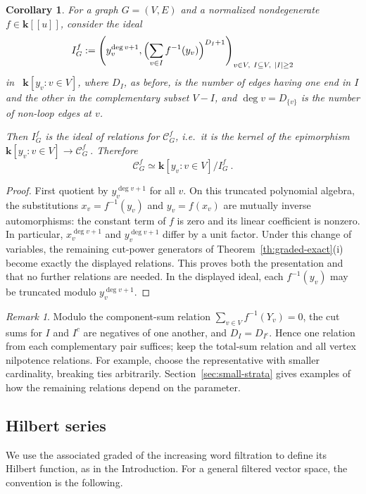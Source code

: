 \documentclass[reqno]{article}
\theoremstyle{plain} %
\newtheorem{corollary}[theorem]{Corollary}
\theoremstyle{definition}
\theoremstyle{remark}
\newtheorem{remark}[theorem]{\sc Remark}
\newcommand{\K} {\mathbf{k}}
\newcommand {\CC}{\mathscr{C}}
\numberwithin{equation}{section}
\begin{document}
\begin{corollary}\label{cor:relations}
  For a graph $G=(V,E)$ and a normalized nondegenerate $f \in \K[[u]]$,
consider the ideal
\begin{equation}
  \label{eq:relations}
I_G^f := \left(y_v^{\deg v+1}, \Bigl( \sum_{v\in I}f^{-1}(y_v) \Bigr) ^{D_I+1}\right)_{v\in V, \ I  \subseteq V, \ |I| \ge 2 }
\end{equation}
in \ $\K[y_v:v\in V]$, where $D_I$, as before, is the number of edges having one end in $I$ and the other  in the complementary subset $V-I$, and $\deg v=D_{\{v\}}$ is the number of non-loop edges at $v$.

Then $I_G^f$ is the ideal of relations for $\CC_G^f$, i.e.\ it is the kernel of the epimorphism
$\K[y_v \colon v\in V]\to \CC_G^f~.$
Therefore
\[\CC_G^f\simeq \K[y_v \colon v\in V]/I_G^f~.\]
 \end{corollary}
\begin{proof}
First quotient by $y_v^{\deg v+1}$ for all $v$. On this truncated
polynomial algebra, the substitutions $x_v=f^{-1}(y_v)$ and
$y_v=f(x_v)$ are mutually inverse automorphisms: the constant term of
$f$ is zero and its linear coefficient is nonzero. In particular,
$x_v^{\deg v+1}$ and $y_v^{\deg v+1}$ differ by a unit factor.
Under this change of variables, the remaining cut-power generators of
Theorem~\ref{th:graded-exact}(i) become exactly the displayed relations.
This proves both the presentation and that no further relations are
needed. In the displayed ideal, each $f^{-1}(y_v)$ may be truncated
modulo $y_v^{\deg v+1}$.
\end{proof}


\begin{remark}
Modulo the component-sum relation $\sum_{v\in V}f^{-1}(Y_v)=0$,
the cut sums for $I$ and $I^c$ are negatives of one another, and
$D_I=D_{I^c}$. Hence one relation from each complementary pair suffices;
keep the total-sum relation and all vertex nilpotence relations. For
example, choose the representative with smaller cardinality, breaking
ties arbitrarily. Section~\ref{sec:small-strata} gives examples of how
the remaining relations depend on the parameter.
\end{remark}

\subsection{Hilbert series}
\label{sec:alg}
We use the associated graded of the increasing word filtration to define
its Hilbert function, as in the Introduction. For a general filtered
vector space, the convention is the following.
\end{document}
